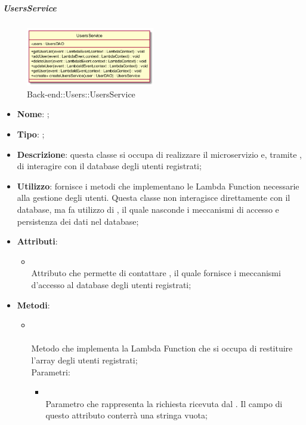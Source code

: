\hypertarget{UsersService_label}{\subparagraph{UsersService}}
\begin{figure}[h]
	\centering
	\includegraphics[width=0.50\textwidth,height=\textheight,keepaspectratio]{images/ClassUsersService.png}
	\caption{Back-end::Users::UsersService}
\end{figure}
\begin{itemize}
	\item \textbf{Nome}: ;
	\item \textbf{Tipo}: ;
	\item \textbf{Descrizione}: questa classe si occupa di realizzare il microservizio  e, tramite , di interagire con il database degli utenti registrati;
	\item \textbf{Utilizzo}: fornisce i metodi che implementano le Lambda Function necessarie alla gestione degli utenti.
Questa classe non interagisce direttamente con il database, ma fa utilizzo di , il quale nasconde i meccanismi di accesso e persistenza dei dati nel database;
	\item \textbf{Attributi}:
	\begin{itemize}
		\item[]  \\
		Attributo che permette di contattare , il quale fornisce i meccanismi d'accesso al database degli utenti registrati;
	\end{itemize}
	\item \textbf{Metodi}:
	\begin{itemize}
		\item[]  \\\\		Metodo che implementa la Lambda Function che si occupa di restituire l'array degli utenti registrati;\\
		Parametri:
		\begin{itemize}
			\item {} \\
			Parametro che rappresenta la richiesta ricevuta dal . Il campo  di questo attributo conterrà una stringa vuota;

\end{itemize}
\end{itemize}
\end{itemize}
